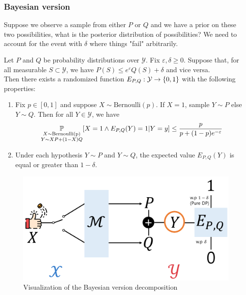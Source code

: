 \documentclass[10pt]{article}
\begin{document}
\subsubsection{Bayesian version \citep[Lemma 5.6]{Steinke2023PrivacyAW}}

\begin{ginzabox}[Question]
    Suppose we observe a sample from either $P$ or $Q$ and we have a prior on these two possibilities, what is the posterior distribution of possibilities? We need to account for the event with $\delta$ where things "fail" arbitrarily. 
\end{ginzabox}

Let $P$ and $Q$ be probability distributions over $\mathcal{Y}$. Fix $\varepsilon, \delta \geq 0$. Suppose that, for all measurable $S \subset \mathcal{Y}$, we have $P(S) \leq e^{\varepsilon} Q(S) +\delta$ and vice versa. \\ 
Then there exists a randomized function $E_{P,Q}: \mathcal{Y} \to \left\{ 0,1 \right\}$ with the following properties: 
\begin{enumerate}
    \item Fix $p \in [0,1]$ and suppose $X \sim \text{Bernoulli} (p)$. If $X=1$, sample $Y  \sim P$ else $Y \sim Q$. Then for all $Y \in \mathcal{Y}$, we have 
    \begin{equation*}
        \mathop{\mathbb{P} \displaystyle}_{\substack{X \sim \text{Bernoulli(p)} \\ Y \sim XP + (1-X)Q}} [ X =1 \wedge E_{P,Q}(Y)=1 | Y=y] \leq \frac{p}{p + (1-p)e^{-\varepsilon}}
    \end{equation*}
    \item Under each hypothesis $Y \sim P$ and $Y \sim Q$, the expected value $E_{P,Q} (Y)$ is equal or greater than $1- \delta$. 
\end{enumerate}
\begin{figure}
    \centering
    \includegraphics[width=1\linewidth]{Figure/5.6_visual.png}
    \caption{Visualization of the Bayesian version decomposition}
    \label{fig:decomposition}
\end{figure}
\end{document}
